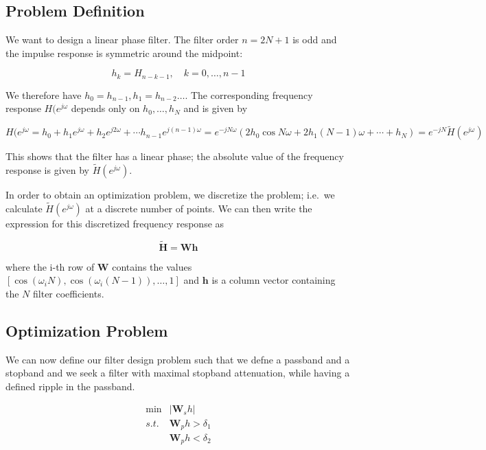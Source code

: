 
\subsection{Problem Definition}

We want to design a linear phase filter. The filter order \(n = 2N+1\)
is odd and the impulse response is symmetric around the midpoint:

\[
h_k = H_{n-k-1}, \quad k=0,\ldots,n-1
\]

We therefore have \(h_0 = h_{n-1}, h_1 = h_{n-2} \ldots\). The
corresponding frequency response \(H(e^{j \omega}\) depends only on
\(h_0,\ldots,h_N\) and is given by

\[
H(e^{j \omega} = h_0 + h_1 e^{j\omega} + h_2 e^{j2\omega} + \cdots h_{n-1} e^{j(n-1)\omega} = e^{-jN\omega} \left( 2h_0 \cos N \omega  + 2 h_1 (N-1) \omega + \cdots + h_N \right) = e^{-jN} \tilde{H}(e^{j \omega})
\]

This shows that the filter has a linear phase; the absolute value of the
frequency response is given by \(\tilde{H}(e^{j\omega})\).

In order to obtain an optimization problem, we discretize the problem;
i.e.~we calculate \(\tilde{H}(e^{j\omega})\) at a discrete number of
points. We can then write the expression for this discretized frequency
response as

\[
\mathbf{\tilde{H}} = \mathbf{W} \mathbf{h}
\]

where the i-th row of \(\mathbf{W}\) contains the values
\([\cos(\omega_i N), \cos(\omega_i (N-1)), \ldots,1]\) and
\(\mathbf{h}\) is a column vector containing the \(N\) filter
coefficients.

\subsection{Optimization Problem}

We can now define our filter design problem such that we defne a
passband and a stopband and we seek a filter with maximal stopband
attenuation, while having a defined ripple in the passband.


\begin{align*}
\min & |\mathbf{W}_s h| \\
s.t. & \mathbf{W}_p h > \delta_1 \\
     & \mathbf{W}_p h < \delta_2 \\
\end{align*}


